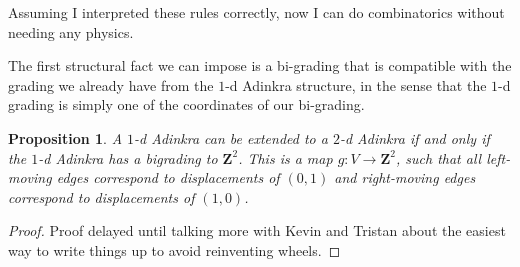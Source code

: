 \documentclass[12pt,twoside,singlespace]{article}
\numberwithin{equation}{section}
\newtheorem{prop}[equation]{Proposition}
\theoremstyle{definition}
\newcommand{\ZZ}{\mathbf{Z}}
\begin{document}
Assuming I interpreted these rules correctly, now I can do combinatorics without needing any physics.


The first structural fact we can impose is a bi-grading that is compatible with the grading we already have from the $1$-d Adinkra structure, in the sense that the $1$-d grading is simply one of the coordinates of our bi-grading.

\begin{prop}
A $1$-d Adinkra can be extended to a $2$-d Adinkra if and only if the $1$-d Adinkra has a \emph{bigrading} to $\ZZ^2$. This is a map $g: V \rightarrow \ZZ^2$, such that all left-moving edges correspond to displacements of $(0, 1)$ and right-moving edges correspond to displacements of $(1, 0)$.
\end{prop}

\begin{proof}
Proof delayed until talking more with Kevin and Tristan about the easiest way to write things up to avoid reinventing wheels.
\end{proof}



\end{document}
